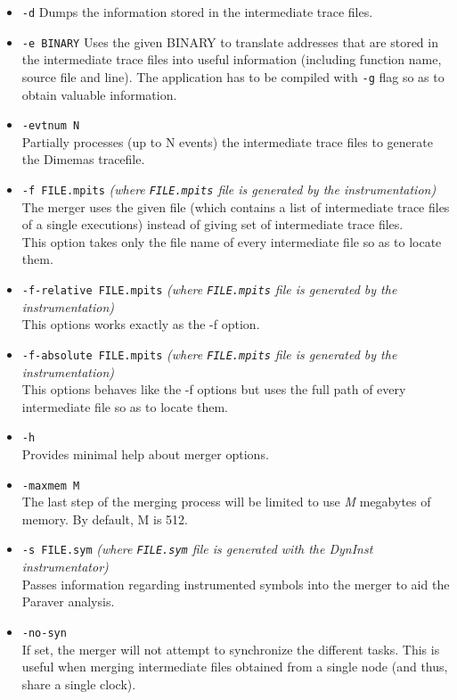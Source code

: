 \begin{itemize}
 \item {\tt -d}
 Dumps the information stored in the intermediate trace files.
 \item {\tt -e BINARY}
 Uses the given BINARY to translate addresses that are stored in the intermediate trace files into useful information (including function name, source file and line). The application has to be compiled with {\tt -g} flag so as to obtain valuable information.
 \item {\tt -evtnum N}\\
 Partially processes (up to N events) the intermediate trace files to generate the Dimemas tracefile.
 \item {\tt -f FILE.mpits} {\em (where {\tt FILE.mpits} file is generated by the instrumentation)}\\
 The merger uses the given file (which contains a list of intermediate trace files of a single executions) instead of giving set of intermediate trace files.\\
 This option takes only the file name of every intermediate file so as to locate them.
 \item {\tt -f-relative FILE.mpits} {\em (where {\tt FILE.mpits} file is generated by the instrumentation)}\\
 This options works exactly as the -f option.
 \item {\tt -f-absolute FILE.mpits} {\em (where {\tt FILE.mpits} file is generated by the instrumentation)}\\
 This options behaves like the -f options but uses the full path of every intermediate file so as to locate them.
 \item {\tt -h}\\
 Provides minimal help about merger options.
 \item {\tt -maxmem M}\\
 The last step of the merging process will be limited to use {\em M} megabytes of memory. By default, M is 512.
 \item {\tt -s FILE.sym} {\em (where {\tt FILE.sym} file is generated with the DynInst instrumentator)}\\
 Passes information regarding instrumented symbols into the merger to aid the Paraver analysis.
 \item {\tt -no-syn}\\
 If set, the merger will not attempt to synchronize the different tasks. This is useful when merging intermediate files obtained from a single node (and thus, share a single clock).

\end{itemize}
